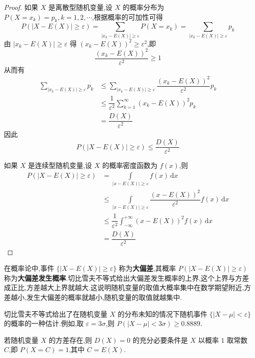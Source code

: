 \begin{proof}
    如果 $X$ 是离散型随机变量,设 $X$ 的概率分布为 $P(X = x_k) = p_k, k=1,2,\cdots$,根据概率的可加性可得
    $$
    P(|X-E(X)| \geqslant \varepsilon) = \sum_{|x_k-E(X)| \geqslant \varepsilon} P(X=x_k) = \sum_{|x_k-E(X)| \geqslant \varepsilon} p_k
    $$
    由 $|x_k-E(X)| \geqslant \varepsilon$ 得 $(x_k-E(X))^2 \geqslant \varepsilon^2$,即
    $$
    \dfrac{(x_k-E(X))^2}{\varepsilon^2} \geqslant 1
    $$
    从而有
    $$
    \begin{aligned}
        \sum_{|x_k-E(X)| \geqslant \varepsilon} p_k & \leqslant \sum_{|x_k-E(X)| \geqslant \varepsilon} \dfrac{(x_k-E(X))^2}{\varepsilon^2} p_k \\
        & \leqslant \dfrac{1}{\varepsilon^2} \sum_{k=1}^{\infty} (x_k-E(X))^2 p_k \\
        &= \dfrac{D(X)}{\varepsilon^2}
    \end{aligned}
    $$
    因此
    $$
    P(|X-E(X)| \geqslant \varepsilon) \leqslant \dfrac{D(X)}{\varepsilon^2}
    $$

    如果 $X$ 是连续型随机变量,设 $X$ 的概率密度函数为 $f(x)$,则
    $$
    \begin{aligned}
        P(|X-E(X)| \geqslant \varepsilon) &= \underset{|x-E(X)| \geqslant \varepsilon}{\int} f(x) \, \text{d}x \\
         & \leqslant \underset{|x-E(X)| \geqslant \varepsilon}{\int} \dfrac{(x-E(X))^2}{\varepsilon^2} f(x) \, \text{d}x \\
         & \leqslant \dfrac{1}{\varepsilon^2} \int_{-\infty}^{+\infty} (x-E(X))^2 f(x) \, \text{d}x \\
         &= \dfrac{D(X)}{\varepsilon^2}
    \end{aligned}
    $$
\end{proof}

在概率论中,事件 $\{ |X-E(X)| \geqslant \varepsilon \}$ 称为\textbf{大偏差},其概率 $P(|X-E(X)| \geqslant \varepsilon)$ 称为\textbf{大偏差发生概率}.切比雪夫不等式给出大偏差发生概率的上界,这个上界与方差成正比,方差越大上界就越大.这说明随机变量的取值大概率集中在数学期望附近,方差越小,发生大偏差的概率就越小,随机变量的取值就越集中.

切比雪夫不等式给出了在随机变量 $X$ 的分布未知的情况下随机事件 $\{ |X-\mu| < \varepsilon \}$ 的概率的一种估计.例如,取 $\varepsilon = 3\sigma$,则 $P(|X-\mu| < 3\sigma) \geqslant 0.8889$.

\begin{theorem}[][][prop:D(X)=0]
    \indent 若随机变量 $X$ 的方差存在,则 $D(X)=0$ 的充分必要条件是 $X$ 以概率 $1$ 取常数 $C$,即 $P(X=C)=1$,其中 $C=E(X)$.
\end{theorem}


